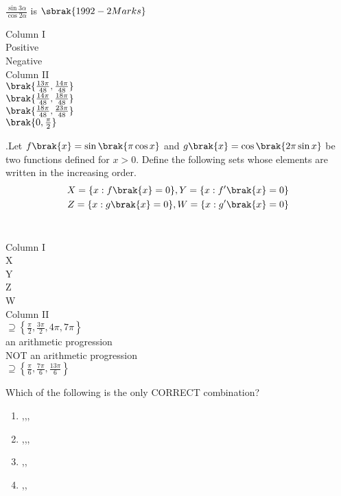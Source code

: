 \iffalse
  \title{Trignometric Functions and Equations}
  \author{EE24BTECH11006- Arnav Mahishi}
  \section{matrix-match}
\fi

\item $\frac{\sin3\alpha}{\cos2\alpha}$ \; is $\hfill{\sbrak{1992-2 Marks}}$
\\
\begin{multicols}{2}
Column I
\\
 Positive
\\
 Negative
\columnbreak
\\
Column II
\\
 $\brak{\frac{13\pi}{48},\frac{14\pi}{48}}$
\\
 $\brak{\frac{14\pi}{48},\frac{18\pi}{48}}$
\\
 $\brak{\frac{18\pi}{48},\frac{23\pi}{48}}$
\\
 $\brak{0,\frac{\pi}{2}}$


\end{multicols}


\item.Let $f\brak{x} = \sin\brak{\pi \cos x}$ and $g\brak{x} = \cos\brak{2\pi \sin x}$ be two functions defined for $x > 0$. Define the following sets whose elements are written in the increasing order. \hfill{}
\begin{align}
X=\{x:f\brak{x}=0\},Y=\{x:f'\brak{x}=0\}\\
Z=\{x:g\brak{x}=0\}, W=\{x:g'\brak{x}=0\}
\end{align}
\\
\begin{multicols}{2}
Column I
\\
 X
\\
 Y
\\
 Z
\\
 W
\columnbreak
\\
Column II
\\
 $\supseteq \left\{ \frac{\pi}{2}, \frac{3\pi}{2}, 4\pi, 7\pi \right\}$
\\
an arithmetic progression
\\
NOT an arithmetic progression
\\
$\supseteq\left\{\frac{\pi}{6},\frac{7\pi}{6},\frac{13\pi}{6}\right\}$


\end{multicols}
Which of the following is the only CORRECT combination?
\begin{enumerate}[label=(\alph*)]
\item{},,,
\item{},,,
\item{},,
\item{},,
\end{enumerate}


